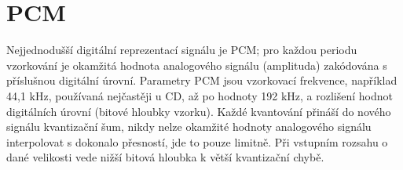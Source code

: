 









\section{PCM}
Nejjednodušší digitální reprezentací signálu je \ac{PCM}; pro každou periodu vzorkování je okamžitá hodnota analogového signálu (amplituda) zakódována s příslušnou digitální úrovní. Parametry PCM jsou vzorkovací frekvence, například 44,1 kHz, používaná nejčastěji u CD, až po hodnoty 192 kHz, a rozlišení hodnot digitálních úrovní (bitové hloubky vzorku). Každé kvantování přináší do nového signálu kvantizační šum, nikdy nelze okamžité hodnoty analogového signálu interpolovat s dokonalo přesností, jde to pouze limitně. Při vstupním rozsahu o dané velikosti vede nižší bitová hloubka k větší kvantizační chybě.

